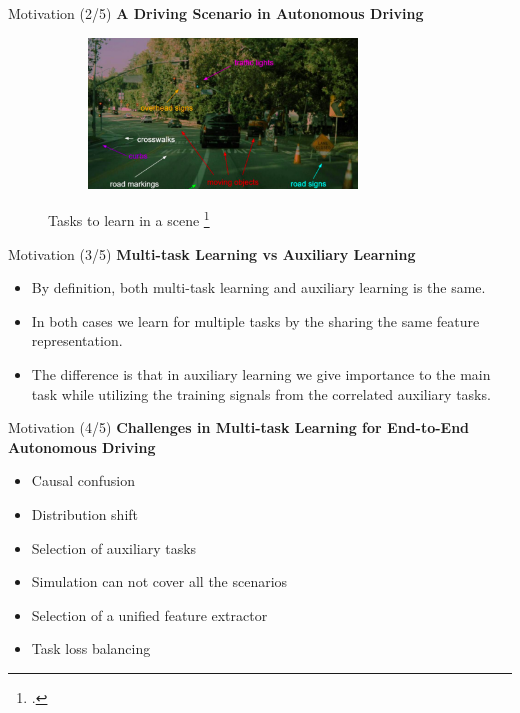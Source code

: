 \documentclass[aspectratio=169]{beamer}
\begin{document}
\begin{frame}{Motivation (2/5)}
  \textbf{A Driving Scenario in Autonomous Driving}
  \begin{figure}[H]
     \centering
     
\begin{subfigure}{\textwidth}
\includegraphics[width=0.6\linewidth, height=4cm]{images/MTL_aux.png} 
\label{fig:subim1}
\end{subfigure}

\caption{Tasks to learn in a scene \footcite{tesla} }
\label{fig:image2}
\end{figure}
\end{frame}

\begin{frame}{Motivation (3/5)}
  \textbf{Multi-task Learning vs Auxiliary Learning}

  \begin{itemize}
      \item By definition, both multi-task learning and auxiliary learning is the same. 
      \item In both cases we learn for multiple tasks by the sharing the same feature representation.
      \item The difference is that in auxiliary learning we give importance to the main task while utilizing the training signals from the correlated auxiliary tasks. 
  \end{itemize}
   
\end{frame}


   
\begin{frame}{Motivation (4/5)}
  \textbf{Challenges in Multi-task Learning for End-to-End Autonomous Driving
}

  \begin{itemize}
      \item Causal confusion
      \item Distribution shift 
      \item Selection of auxiliary tasks
      \item Simulation can not cover all the scenarios 
      \item Selection of a unified feature extractor 
      \item Task loss balancing
  \end{itemize}
\end{frame}
\end{document}

